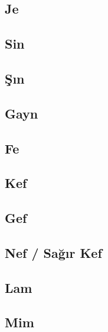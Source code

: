 \subsection*{Je}
\uyumluharftablo{\arje}{\Lje\latdownje}{\isimje}{\trtlfje}

\subsection*{Sin}
\uyumluharftablo{\arsin}{\Lsin\latdownsin}{\isimsin}{\trtlfsin}

\subsection*{Şın}
\uyumluharftablo{\arshin}{\Lshin\latdownshin}{\isimshin}{\trtlfshin}

\subsection*{Gayn}
\uyumluharftablo{\argayn}{\Lgayn\latdowngayn}{\isimgayn}{\trtlfgayn}

\subsection*{Fe}
\uyumluharftablo{\arfe}{\Lfe\latdownfe}{\isimfe}{\trtlffe}

\subsection*{Kef}
\uyumluharftablo{\arkef}{\Lkef\latdownkef}{\isimkef}{\trtlfkef}

\subsection*{Gef}
\uyumluharftablo{\argef}{\Lgef\latdowngef}{\isimgef}{\trtlfgef}

\subsection*{Nef / Sağır Kef}
\uyumluharftablo{\arnef}{\Lnef\latdownnef}{\isimnef}{\trtlfnef}

\subsection*{Lam}
\uyumluharftablo{\arlam}{\Llam\latdownlam}{\isimlam}{\trtlflam}

\subsection*{Mim}
\uyumluharftablo{\armim}{\Lmim\latdownmim}{\isimmim}{\trtlfmim}

